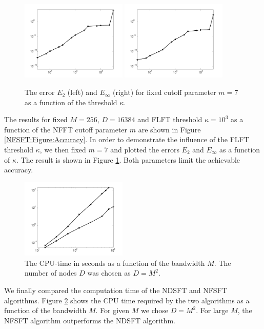 \begin{figure}[tb]
  \centering
  \subfigure
  {
  \label{NFSFT:Figure:Accuracy:t2}
  \includegraphics[width=0.45\textwidth]{images/accuracy_t_2}
  }
  \hfill
  \subfigure
  {
  \label{NFSFT:Figure:Accuracy:tinf}
  \includegraphics[width=0.45\textwidth]{images/accuracy_t_inf}
  }
  \caption{The error $E_{2}$ (left) and $E_{\infty}$ (right) for fixed 
  cutoff parameter $m = 7$ as a function of the threshold $\kappa$.}
  \label{NFSFT:Figure:Accuracy2}
\end{figure}

The results for fixed $M = 256$, $D = 16384$ and FLFT threshold 
$\kappa=10^3$ as a function of the NFFT cutoff parameter $m$ 
are shown in Figure \ref{NFSFT:Figure:Accuracy}. In order to 
demonstrate the influence of the FLFT threshold $\kappa$, we then fixed 
$m=7$ and plotted the errors $E_{2}$ and $E_{\infty}$ as a function
of $\kappa$. The result is shown in Figure \ref{NFSFT:Figure:Accuracy2}. Both parameters limit 
the achievable accuracy.

\begin{figure}[tb]
  \centering
  \includegraphics[width=0.45\textwidth]{images/timing}
  \caption{The CPU-time in seconds as a function of the bandwidth $M$. 
  The number of nodes $D$ was chosen as $D=M^2$.}
  \label{NFSFT:Figure:Timing}
\end{figure}

We finally compared the computation time of the NDSFT and NFSFT algorithms.
Figure \ref{NFSFT:Figure:Timing} shows the CPU time required by the two
algorithms as a
function of the bandwidth $M$. For given $M$ we chose $D=M^2$. For large 
$M$, the NFSFT algorithm outperforms the NDSFT algorithm.

